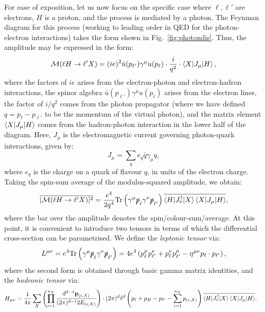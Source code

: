 \documentclass[withindex,glossary]{cam-thesis}
\renewcommand{\vec}[1]{\textbf{#1}} %
\begin{document}
For ease of exposition, let us now focus on the specific case where $\ell, \ell'$ are electrons, $H$ is a proton, and the process is mediated by a photon. The Feynman diagram for this process (working to leading order in QED for the photon-electron interactions) takes the form shown in Fig.~\ref{fig:photondis}. Thus, the amplitude may be expressed in the form:
\begin{equation}
\mathcal{M}(\ell H \rightarrow \ell'X) = (ie)^2 \bar{u}(p_{\ell'}) \gamma^{\mu} u(p_{\ell}) \cdot \frac{i}{q^2} \cdot \braket{X | J_{\mu} | H},
\end{equation}
where the factors of $ie$ arises from the electron-photon and electron-hadron interactions, the spinor algebra $\bar{u}(p_{\ell'}) \gamma^{\mu} u(p_{\ell})$ arises from the electron lines, the factor of $i/q^2$ comes from the photon propagator (where we have defined $q = p_{\ell} - p_{\ell'}$ to be the momentum of the virtual photon), and the matrix element $\braket{X | J_{\mu} | H}$ comes from the hadron-photon interaction in the lower half of the diagram. Here, $J_{\mu}$ is the electromagnetic current governing photon-quark interactions, given by:
\begin{equation}
J_{\mu} = \sum_{q} e_q \bar{q} \gamma_{\mu} q,
\end{equation}
where $e_q$ is the charge on a quark of flavour $q$, in units of the electron charge. Taking the spin-sum average of the modulus-squared amplitude, we obtain:
\begin{equation}
\overline{|\mathcal{M}(\ell H \rightarrow \ell'X)|^2} = \frac{e^4}{2q^4} \textrm{Tr}\left( \gamma^{\mu} \slashed{p}_{\ell} \gamma^{\nu} \slashed{p}_{\ell'} \right) \overline{\braket{H | J_{\nu}^{\dagger} | X}\braket{X | J_{\mu} | H}},
\end{equation}
where the bar over the amplitude denotes the spin/colour-sum/average. At this point, it is convenient to introduce two tensors in terms of which the differential cross-section can be parametrised. We define the \textit{leptonic tensor} via:
\begin{equation}
\label{eq:leptonic_tensor}
L^{\mu\nu} = e^4 \textrm{Tr}\left(  \gamma^{\mu} \slashed{p}_{\ell} \gamma^{\nu} \slashed{p}_{\ell'} \right) = 4e^4 \left( p_{\ell}^{\mu} p_{\ell'}^{\nu} + p_{\ell}^{\nu} p_{\ell'}^{\mu} - \eta^{\mu\nu} p_{\ell} \cdot p_{\ell'} \right),
\end{equation}
where the second form is obtained through basic gamma matrix identities, and the \textit{hadronic tensor} via:
\begin{align}
\label{eq:hadronic_tensor}
H_{\mu\nu} &= \frac{1}{4\pi} \sum_{X} \left(\prod_{i=1}^{n_X} \frac{d^{d-1} \vec{p}_{(i,X)}}{(2\pi)^{d-1} 2E_{(i,X)}}\right) \cdot (2\pi)^d \delta^d\left(p_\ell + p_H - p_{\ell'} - \sum_{i=1}^{n_X} p_{(i,X)}\right)  \overline{\braket{H | J_{\nu}^{\dagger} | X}\braket{X | J_{\mu} | H}}.
\end{align}
\end{document}
